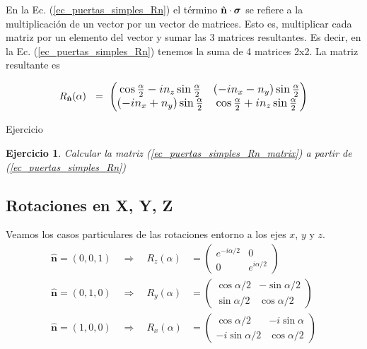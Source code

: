 \documentclass[a4paper,11pt]{book} %
\newtheorem{ejercicio_contador}{Ejercicio}
\newcommand{\Ejercicio}[1]{
		\begin{mybox_gray}{Ejercicio} 
			\begin{ejercicio_contador}
				 #1 
			\end{ejercicio_contador} 
		\end{mybox_gray}
	}
\numberwithin{equation}{chapter}
\def\lp{\left(}
\def\rp{\right)}
\def\rqa{\quad \Rightarrow \quad}
\begin{document}
En la Ec. (\ref{ec_puertas_simples_Rn}) el término $\hat{\bf n}\cdot \boldsymbol{\sigma}$ se refiere a la multiplicación de un vector por un vector de matrices. Esto es, multiplicar cada matriz por un elemento del vector y sumar las 3 matrices resultantes. Es decir, en la Ec. (\ref{ec_puertas_simples_Rn}) tenemos la suma de 4 matrices 2x2. La matriz resultante es
	
	\begin{equation} \label{ec_puertas_simples_Rn_matrix}
	R_{\hat{\bf n}}(\alpha)~  ~=~ \large{\lp \begin{matrix} 
	\cos \frac{\alpha}{2} - i n_z\sin\frac{\alpha}{2} 
	& (-in_x- n_y)\sin\frac{\alpha}{2} \\ 
	(-in_x + n_y) \sin\frac{\alpha}{2} 
	&  \cos \frac{\alpha}{2} + i n_z\sin\frac{\alpha}{2} 
	\end{matrix} \rp}
	\end{equation}
			

\Ejercicio{
Calcular la matriz (\ref{ec_puertas_simples_Rn_matrix}) a partir de (\ref{ec_puertas_simples_Rn})
}

        \subsection{Rotaciones en X, Y, Z}

Veamos los casos particulares de las rotaciones entorno a los ejes $x$, $y$ y $z$.        
\begin{align}
\bm \hat{n} = (0,0,1) \rqa R_z(\alpha) & = 
	 \lp \begin{matrix}
	 e^{-i \alpha/2} & 0                       \\
	 0               & e^{i \alpha/2} 
	 \end{matrix} \rp   \label{ec_puertas_simples_Rz} \\
\bm \hat{n} = (0,1,0) \rqa R_y(\alpha) & =
	 \lp \begin{matrix}
	 \cos \alpha/2     &  -\sin \alpha/2       \\
	 \sin \alpha/2     &  \cos \alpha/2 
	 \end{matrix} \rp  \label{ec_puertas_simples_Ry} \\
\bm \hat{n} = (1,0,0) \rqa R_x(\alpha) & = 
	 \lp \begin{matrix}
	 \cos \alpha/2       &   -i \sin \alpha     \\
	 -i \sin \alpha/2    &   \cos \alpha/2 
	 \end{matrix} \rp \label{ec_puertas_simples_Rx}
\end{align} 
        
\end{document}
